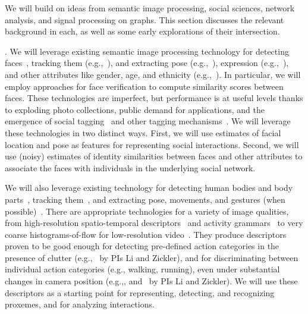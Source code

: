 \label{sec:background}

We will build on ideas from semantic image processing, social sciences, network analysis, and signal processing on graphs. This section discusses the relevant background in each, as well as some early explorations of their intersection.

. We will leverage existing semantic image processing technology for detecting faces~\cite{ViolaJones,Zhang:detect}, tracking them (e.g.,~\cite{Comaniciu:track}), and extracting pose (e.g.,~\cite{Hanson,Murphy-Chutorian:pose}), expression (e.g.,~\cite{Matthews:AAM,delaTorre:expression,Essa:expression}), and other attributes like gender, age, and ethnicity (e.g.,~\cite{LNCS53050340, Gender, Age}).  In particular, we will employ approaches for face verification \cite{ChopraVerification,Kumar09attributeand,DeepFace} to compute similarity scores between faces. These technologies are imperfect, but performance is at useful levels thanks to exploding photo collections, public demand for applications, and the emergence of social tagging~\cite{Stone2008,Stone2010} and other tagging mechanisms~\cite{berg2004naf,berg2005sp,Everingham06a,huang:lfw,YangBKR12}. We will leverage these technologies in two distinct ways. First, we will use estimates of facial location and pose as features for representing social interactions. Second, we will use (noisy) estimates of identity similarities between faces and other attributes to associate the faces with individuals in the underlying social network. 

We will also leverage existing technology for detecting human bodies and body parts~\cite{Dalal:HOG,poselet,pose_part}, tracking them~\cite{RamananFZ07,EshelM10}, and extracting pose, movements, and gestures (when possible)~\cite{Mitra:gesture,Ryoo:action,Poppe}. There are appropriate technologies for a variety of image qualities, from high-resolution spatio-temporal descriptors~\cite{Dollar:STIP,Laptev:STIP,Brox:flow} and activity grammars~\cite{Niebles2007,Niebles2006} to very coarse histograms-of-flow for low-resolution video~\cite{EfrosBMM03}. They produce descriptors proven to be good enough for detecting pre-defined action categories in the presence of clutter (e.g.,~\cite{groupdet2013, Li2010} by PIs Li and Zickler), and for discriminating between individual action categories (e.g., walking, running), even under substantial changes in camera position (e.g.,\cite{Weinland:invariance2}, and~\cite{LiZickler2012} by PIs Li and Zickler). We will use these descriptors as a starting point for representing, detecting, and recognizing proxemes, and for analyzing interactions.

